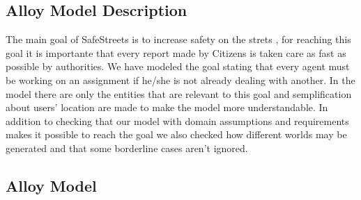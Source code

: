 \subsection{Alloy Model Description}
The main goal of SafeStreets is to increase safety on the strets , for reaching this goal it is importante that every report made by Citizens is taken care as fast as possible by authorities. We have modeled the goal stating that every agent must be working on an assignment if he/she is not already dealing with another. In the model there are only the entities that are relevant to this goal and semplification about users' location are made to make the model more understandable.
In addition to checking that our model with domain assumptions and requirements makes it possible to reach the goal we also checked how different worlds may be generated and that some borderline cases aren't ignored.

\subsection{Alloy Model}



